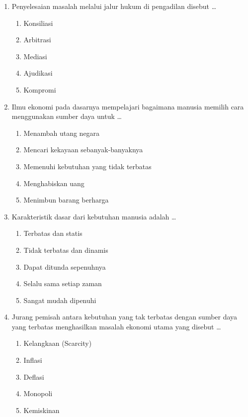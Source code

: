 \documentclass[12pt,a4paper]{article}
\begin{document}
\begin{enumerate}[leftmargin=*]
\item Penyelesaian masalah melalui jalur hukum di pengadilan disebut \dots
    \begin{enumerate}[label=\alph*.]
        \item Konsiliasi
        \item Arbitrasi
        \item Mediasi
        \item Ajudikasi
        \item Kompromi
    \end{enumerate}

\item Ilmu ekonomi pada dasarnya mempelajari bagaimana manusia memilih cara menggunakan sumber daya untuk \dots
    \begin{enumerate}[label=\alph*.]
        \item Menambah utang negara
        \item Mencari kekayaan sebanyak-banyaknya
        \item Memenuhi kebutuhan yang tidak terbatas
        \item Menghabiskan uang
        \item Menimbun barang berharga
    \end{enumerate}

\item Karakteristik dasar dari kebutuhan manusia adalah \dots
    \begin{enumerate}[label=\alph*.]
        \item Terbatas dan statis
        \item Tidak terbatas dan dinamis
        \item Dapat ditunda sepenuhnya
        \item Selalu sama setiap zaman
        \item Sangat mudah dipenuhi
    \end{enumerate}

\item Jurang pemisah antara kebutuhan yang tak terbatas dengan sumber daya yang terbatas menghasilkan masalah ekonomi utama yang disebut \dots
    \begin{enumerate}[label=\alph*.]
        \item Kelangkaan (Scarcity)
        \item Inflasi
        \item Deflasi
        \item Monopoli
        \item Kemiskinan
    \end{enumerate}


\end{enumerate}
\end{document}
